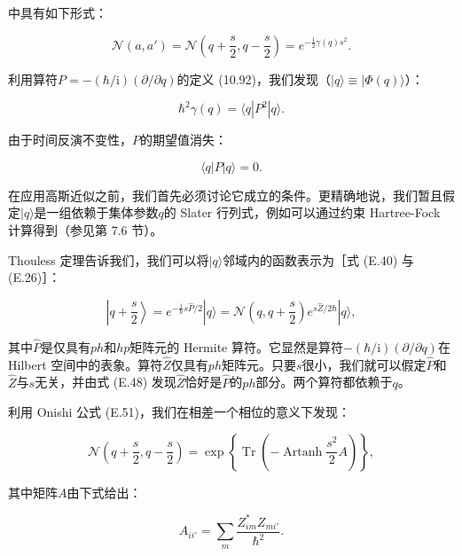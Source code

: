 中具有如下形式：

\begin{equation}
\mathscr{N}(a,a')=\mathscr{N}\left(q+\frac{s}{2},q-\frac{s}{2}\right)=e^{-\frac{1}{2}\gamma(q)s^{2}}.\label{eq:10.111}
\end{equation}

利用算符$P=-(\hbar/\mathrm{i})(\partial/\partial q)$的定义 (10.92)，我们发现（$|q\rangle\equiv|\Phi(q)\rangle$）：

\begin{equation}
\hbar^{2}\gamma(q)=\langle q|P^{2}|q\rangle.\label{eq:10.112}
\end{equation}

由于时间反演不变性，$P$的期望值消失：

\begin{equation}
\langle q|P|q\rangle=0.\label{eq:10.113}
\end{equation}

在应用高斯近似之前，我们首先必须讨论它成立的条件。更精确地说，我们暂且假定$|q\rangle$是一组依赖于集体参数$q$的 Slater
行列式，例如可以通过约束 Hartree-Fock 计算得到（参见第 7.6 节）。

Thouless 定理告诉我们，我们可以将$|q\rangle$邻域内的函数表示为［式 (E.40) 与 (E.26)］：

\begin{equation}
\left|q+\frac{s}{2}\right\rangle =e^{-\frac{\mathrm{i}}{\hbar}s\hat{P}/2}|q\rangle=\mathscr{N}\left(q,q+\frac{s}{2}\right)e^{s\hat{Z}/2\hbar}|q\rangle,\label{eq:10.114}
\end{equation}

其中$\hat{P}$是仅具有$ph$和$hp$矩阵元的 Hermite 算符。它显然是算符$-(\hbar/\mathrm{i})(\partial/\partial q)$在
Hilbert 空间中的表象。算符$\hat{Z}$仅具有$ph$矩阵元。只要$s$很小，我们就可以假定$\hat{P}$和$\hat{Z}$与$s$无关，并由式
(E.48) 发现$\hat{Z}$恰好是$\hat{P}$的$ph$部分。两个算符都依赖于$q$。

利用 Onishi 公式 (E.51)，我们在相差一个相位的意义下发现：

\begin{equation}
\mathscr{N}\left(q+\frac{s}{2},q-\frac{s}{2}\right)=\exp\left\{ \operatorname{Tr}\left(-\operatorname{Artanh}\frac{s^{2}}{2}A\right)\right\} ,\label{eq:10.115}
\end{equation}

其中矩阵$A$由下式给出：

\begin{equation}
A_{ii'}=\sum_{m}\frac{Z^{*}_{im}Z_{mi'}}{\hbar^{2}}.\label{eq:10.116}
\end{equation}

